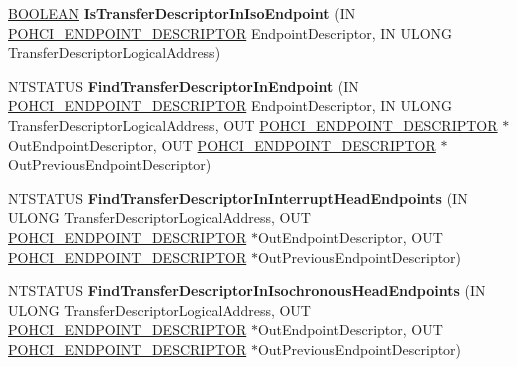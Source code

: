 \begin{DoxyCompactItemize}
\item 
\mbox{\label{class_c_u_s_b_queue_a53c43a313f9e89476bd2b7bfede73a92}} 
\hyperlink{_processor_bind_8h_a112e3146cb38b6ee95e64d85842e380a}{B\+O\+O\+L\+E\+AN} {\bfseries Is\+Transfer\+Descriptor\+In\+Iso\+Endpoint} (IN \hyperlink{struct___o_h_c_i___e_n_d_p_o_i_n_t___d_e_s_c_r_i_p_t_o_r}{P\+O\+H\+C\+I\+\_\+\+E\+N\+D\+P\+O\+I\+N\+T\+\_\+\+D\+E\+S\+C\+R\+I\+P\+T\+OR} Endpoint\+Descriptor, IN U\+L\+O\+NG Transfer\+Descriptor\+Logical\+Address)
\item 
\mbox{\label{class_c_u_s_b_queue_ac91546fe35d22b844abdabc4bc27bed6}} 
N\+T\+S\+T\+A\+T\+US {\bfseries Find\+Transfer\+Descriptor\+In\+Endpoint} (IN \hyperlink{struct___o_h_c_i___e_n_d_p_o_i_n_t___d_e_s_c_r_i_p_t_o_r}{P\+O\+H\+C\+I\+\_\+\+E\+N\+D\+P\+O\+I\+N\+T\+\_\+\+D\+E\+S\+C\+R\+I\+P\+T\+OR} Endpoint\+Descriptor, IN U\+L\+O\+NG Transfer\+Descriptor\+Logical\+Address, O\+UT \hyperlink{struct___o_h_c_i___e_n_d_p_o_i_n_t___d_e_s_c_r_i_p_t_o_r}{P\+O\+H\+C\+I\+\_\+\+E\+N\+D\+P\+O\+I\+N\+T\+\_\+\+D\+E\+S\+C\+R\+I\+P\+T\+OR} $\ast$Out\+Endpoint\+Descriptor, O\+UT \hyperlink{struct___o_h_c_i___e_n_d_p_o_i_n_t___d_e_s_c_r_i_p_t_o_r}{P\+O\+H\+C\+I\+\_\+\+E\+N\+D\+P\+O\+I\+N\+T\+\_\+\+D\+E\+S\+C\+R\+I\+P\+T\+OR} $\ast$Out\+Previous\+Endpoint\+Descriptor)
\item 
\mbox{\label{class_c_u_s_b_queue_affa991293173441e4442f074a43b9a79}} 
N\+T\+S\+T\+A\+T\+US {\bfseries Find\+Transfer\+Descriptor\+In\+Interrupt\+Head\+Endpoints} (IN U\+L\+O\+NG Transfer\+Descriptor\+Logical\+Address, O\+UT \hyperlink{struct___o_h_c_i___e_n_d_p_o_i_n_t___d_e_s_c_r_i_p_t_o_r}{P\+O\+H\+C\+I\+\_\+\+E\+N\+D\+P\+O\+I\+N\+T\+\_\+\+D\+E\+S\+C\+R\+I\+P\+T\+OR} $\ast$Out\+Endpoint\+Descriptor, O\+UT \hyperlink{struct___o_h_c_i___e_n_d_p_o_i_n_t___d_e_s_c_r_i_p_t_o_r}{P\+O\+H\+C\+I\+\_\+\+E\+N\+D\+P\+O\+I\+N\+T\+\_\+\+D\+E\+S\+C\+R\+I\+P\+T\+OR} $\ast$Out\+Previous\+Endpoint\+Descriptor)
\item 
\mbox{\label{class_c_u_s_b_queue_ad525716ced58cb012d89cd18711b58f1}} 
N\+T\+S\+T\+A\+T\+US {\bfseries Find\+Transfer\+Descriptor\+In\+Isochronous\+Head\+Endpoints} (IN U\+L\+O\+NG Transfer\+Descriptor\+Logical\+Address, O\+UT \hyperlink{struct___o_h_c_i___e_n_d_p_o_i_n_t___d_e_s_c_r_i_p_t_o_r}{P\+O\+H\+C\+I\+\_\+\+E\+N\+D\+P\+O\+I\+N\+T\+\_\+\+D\+E\+S\+C\+R\+I\+P\+T\+OR} $\ast$Out\+Endpoint\+Descriptor, O\+UT \hyperlink{struct___o_h_c_i___e_n_d_p_o_i_n_t___d_e_s_c_r_i_p_t_o_r}{P\+O\+H\+C\+I\+\_\+\+E\+N\+D\+P\+O\+I\+N\+T\+\_\+\+D\+E\+S\+C\+R\+I\+P\+T\+OR} $\ast$Out\+Previous\+Endpoint\+Descriptor)

\end{DoxyCompactItemize}
